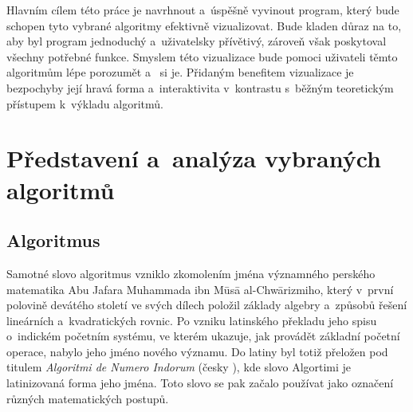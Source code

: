 \documentclass[12pt]{report}			%
\begin{document}
	 
	 	
Hlavním cílem této práce je navrhnout a~úspěšně vyvinout program, který bude schopen tyto vybrané algoritmy efektivně vizualizovat. Bude kladen důraz na to, aby byl program jednoduchý a~uživatelsky přívětivý, zároveň však poskytoval všechny potřebné funkce. Smyslem této vizualizace bude pomoci uživateli těmto algoritmům lépe porozumět a~ si je. %
Přidaným benefitem vizualizace je bezpochyby její hravá forma a~interaktivita
v~kontrastu s~běžným teoretickým přístupem k~výkladu algoritmů.

		
				
	\part{Představení a~analýza vybraných algoritmů}
	
		\chapter{Algoritmus}
		Samotné slovo algoritmus vzniklo zkomolením jména významného perského matematika Abu Jafara Muhammada ibn Mūsā al-Chwārizmiho, který v~první polovině devátého století ve svých
dílech položil základy algebry a~způsobů řešení lineárních a~kvadratických rovnic. Po vzniku latinského překladu
jeho spisu o~indickém početním systému, ve kterém ukazuje, jak provádět základní početní
operace, nabylo jeho jméno nového významu. Do latiny byl totiž přeložen pod titulem \emph{Algoritmi de Numero Indorum} (česky ), kde slovo Algortimi je latinizovaná
forma jeho jména. Toto slovo se pak začalo používat jako označení různých
matematických postupů. \cite{cerny} \cite{neckar} \cite{mehri}
			
		
			
\end{document}
